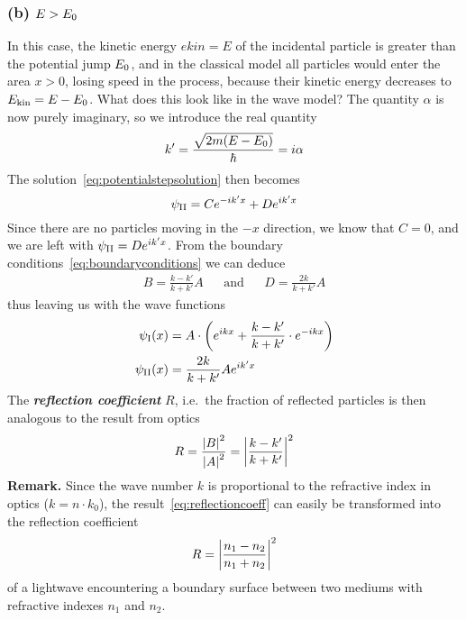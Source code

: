 \documentclass[../../script.tex]{subfiles}
\begin{document}
\subsubsection{(b) $E > E_{\text{0}}$}
In this case, the kinetic energy $ekin = E$ of the incidental particle is greater than the potential jump $E_{\text{0}}$, and in the classical model all particles would enter the area $x > 0$,
losing speed in the process, because their kinetic energy decreases to $E_{\text{kin}} = E - E_{\text{0}}$. What does this look like in the wave model? The quantity $\alpha$ is now purely imaginary, so we introduce the real quantity
\begin{equation}
	k' = \frac{\sqrt{2m(E - E_{\text{0}})}}{\hbar} = i\alpha
\end{equation}
The solution~\eqref{eq:potentialstepsolution} then becomes 
\begin{equation}
	\wave[II] = Ce^{-ik'x} + De^{ik'x}
\end{equation}
Since there are no particles moving in the $-x$ direction, we know that $C = 0$, and we are left with $\wave[II] = De^{ik'x}$.
From the boundary conditions~\eqref{eq:boundaryconditions} we can deduce 
\begin{align}
	B = \frac{k - k'}{k + k'}A && \text{and} && D = \frac{2k}{k + k'}A
\end{align}
thus leaving us with the wave functions
\begin{equation}
	\begin{split}
		\wave[I](x) &= A \cdot \left(e^{ikx} + \frac{k - k'}{k + k'} \cdot e^{-ikx} \right) \\
		\wave[II](x) &= \frac{2k}{k + k'}Ae^{ik'x}
	\end{split}
\end{equation}
The \textbf{\textit{reflection coefficient}} $R$, i.e.\ the fraction of reflected particles is then analogous to the result from optics
\begin{equation}\label{eq:reflectioncoeff}
	R = \frac{\abs{B}^2}{\abs{A}^2} = \abs{\frac{k - k'}{k + k'}}^2
\end{equation}
\textbf{Remark.} Since the wave number $k$ is proportional to the refractive index in optics ($k = n \cdot k_0$), the result~\eqref{eq:reflectioncoeff} can easily be transformed into the reflection coefficient 
\[
	R = \abs{\frac{n_1 - n_2}{n_1 + n_2}}^2
\]
of a lightwave encountering a boundary surface between two mediums with refractive indexes $n_1$ and $n_2$.
\end{document}
